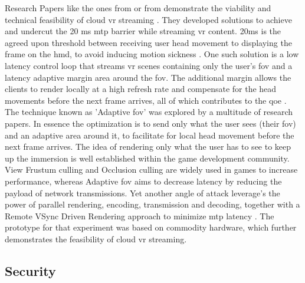 Research Papers like the ones from \cite{cutcord} or from \cite{mvr} demonstrate the viability and technical feasibility of cloud \acrshort{vr} streaming . They developed solutions to achieve and undercut the 20 \acrfull{ms} \acrfull{mtp} barrier while streaming \acrshort{vr} content. 20\acrshort{ms} is the agreed upon threshold between receiving user head movement to displaying the frame on the \acrfull{hmd}, to avoid inducing motion sickness \parencite{valvevrlatency}. One such solution is a low latency control loop that streams \acrshort{vr} scenes containing only the user’s \acrfull{fov} and a latency adaptive margin area around the \acrshort{fov}. The additional margin allows the clients to render locally at a high refresh rate and compensate for the head movements before the next frame arrives, all of which contributes to the \acrshort{qoe} \parencite{mvr}. The technique known as 'Adaptive \acrshort{fov}' was explored by a multitude of research papers. In essence the optimization is to send only what the user sees (their \acrshort{fov}) and an adaptive area around it, to facilitate for local head movement before the next frame arrives. The idea of rendering only what the user has to see to keep up the immersion is well established within the game development community. View Frustum culling and Occlusion culling \parencite{cullingdefinition} are widely used in games to increase performance, whereas Adaptive \acrshort{fov} aims to decrease latency by reducing the payload of network transmissions. Yet another angle of attack leverage's the power of parallel rendering, encoding, transmission and decoding, together with a Remote VSync Driven Rendering approach to minimize \acrshort{mtp} latency \parencite{cutcord}. The prototype for that experiment was based on commodity hardware, which further demonstrates the feasibility of cloud \acrshort{vr} streaming. 

\subsection{Security} 